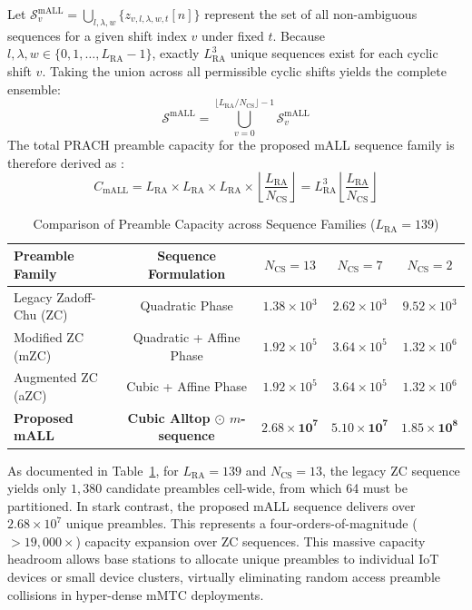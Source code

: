 Let $\mathcal{S}_v^{\mathrm{mALL}} = \bigcup_{l, \lambda, w} \{ z_{v, l, \lambda, w, t}[n] \}$ represent the set of all non-ambiguous sequences for a given shift index $v$ under fixed $t$. Because $l, \lambda, w \in \{0, 1, \dots, L_{\mathrm{RA}}-1\}$, exactly $L_{\mathrm{RA}}^3$ unique sequences exist for each cyclic shift $v$. Taking the union across all permissible cyclic shifts yields the complete ensemble:
\begin{equation}
    \mathcal{S}^{\mathrm{mALL}} = \bigcup_{v=0}^{\lfloor L_{\mathrm{RA}}/N_{\mathrm{CS}} \rfloor - 1} \mathcal{S}_v^{\mathrm{mALL}}
\end{equation}
The total PRACH preamble capacity for the proposed mALL sequence family is therefore derived as \cite{pawar2023high}:
\begin{equation}
    \label{eq:mall_capacity}
    C_{\mathrm{mALL}} = L_{\mathrm{RA}} \times L_{\mathrm{RA}} \times L_{\mathrm{RA}} \times \left\lfloor \frac{L_{\mathrm{RA}}}{N_{\mathrm{CS}}} \right\rfloor = L_{\mathrm{RA}}^3 \left\lfloor \frac{L_{\mathrm{RA}}}{N_{\mathrm{CS}}} \right\rfloor
\end{equation}

\begin{table}[htbp]
\centering
\caption{Comparison of Preamble Capacity across Sequence Families ($L_{\mathrm{RA}} = 139$)}
\label{tab:preamble_capacity_comp}
\begin{tabular}{lcccc}
\toprule
\textbf{Preamble Family} & \textbf{Sequence Formulation} & $N_{\mathrm{CS}} = 13$ & $N_{\mathrm{CS}} = 7$ & $N_{\mathrm{CS}} = 2$ \\
\midrule
Legacy Zadoff-Chu (ZC) \cite{3gpp38211} & Quadratic Phase & $1.38 \times 10^3$ & $2.62 \times 10^3$ & $9.52 \times 10^3$ \\
Modified ZC (mZC) \cite{pawar2023high} & Quadratic + Affine Phase & $1.92 \times 10^5$ & $3.64 \times 10^5$ & $1.32 \times 10^6$ \\
Augmented ZC (aZC) & Cubic + Affine Phase & $1.92 \times 10^5$ & $3.64 \times 10^5$ & $1.32 \times 10^6$ \\
\textbf{Proposed mALL} \cite{pawar2023high} & \textbf{Cubic Alltop $\odot$ $m$-sequence} & $\mathbf{2.68 \times 10^7}$ & $\mathbf{5.10 \times 10^7}$ & $\mathbf{1.85 \times 10^8}$ \\
\bottomrule
\end{tabular}
\end{table}

As documented in Table~\ref{tab:preamble_capacity_comp}, for $L_{\mathrm{RA}} = 139$ and $N_{\mathrm{CS}} = 13$, the legacy ZC sequence yields only $1{,}380$ candidate preambles cell-wide, from which 64 must be partitioned. In stark contrast, the proposed mALL sequence delivers over $2.68 \times 10^7$ unique preambles. This represents a four-orders-of-magnitude ($> 19{,}000\times$) capacity expansion over ZC sequences. This massive capacity headroom allows base stations to allocate unique preambles to individual IoT devices or small device clusters, virtually eliminating random access preamble collisions in hyper-dense mMTC deployments.

